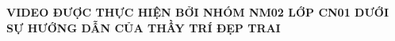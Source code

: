 \documentclass[preview]{standalone}
\begin{document}
\begin{center}
\textbf{VIDEO ĐƯỢC THỰC HIỆN BỞI NHÓM NM02 LỚP CN01 DƯỚI SỰ HƯỚNG DẪN CỦA THẦY TRÍ ĐẸP TRAI}
\end{center}
\end{document}
